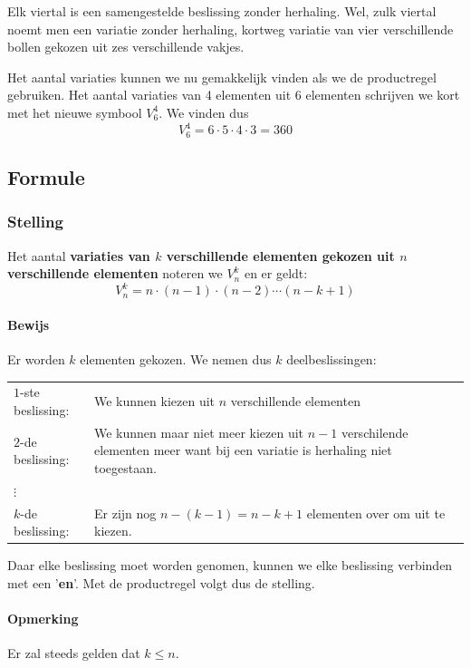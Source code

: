 \documentclass[12pt,a4paper,twoside]{article}
\begin{document}
Elk viertal is een samengestelde beslissing zonder herhaling. Wel, zulk viertal
noemt men een variatie zonder herhaling, kortweg variatie van vier verschillende bollen gekozen uit zes verschillende vakjes.

Het aantal variaties kunnen we nu gemakkelijk vinden als we de productregel gebruiken. Het aantal variaties van 4 elementen uit 6 elementen schrijven we kort met het nieuwe symbool $V^4_6$. We vinden dus
\[ V^4_6 = 6 \cdot 5 \cdot 4 \cdot 3 = 360 \]

\subsection{Formule}

\subsubsection*{Stelling}
\begin{mdframed}
Het aantal {\bf variaties van $k$ verschillende elementen gekozen uit $n$ verschillende elementen} noteren we $V^k_n$ en er geldt:
$$V^k_n=n \cdot (n-1) \cdot (n-2) \cdots (n-k+1)$$
\end{mdframed}

\paragraph*{Bewijs}
Er worden $k$ elementen gekozen. We nemen dus $k$ deelbeslissingen:
\begin{center}
\begin{tabular}{lp{12cm}}
$1$-ste beslissing: & We kunnen kiezen uit $n$ verschillende elementen\\
$2$-de beslissing: & We kunnen maar niet meer kiezen uit $n-1$ verschilende elementen meer want bij een variatie is herhaling niet toegestaan.\\
$\vdots$ & \\
$k$-de beslissing: & Er zijn nog $n-(k-1)=n-k+1$ elementen over om uit te kiezen.
\end{tabular}
\end{center}
Daar elke beslissing moet worden genomen, kunnen we elke beslissing verbinden met een '{\bf en}'. Met de productregel volgt dus de stelling.


\paragraph*{Opmerking} Er zal steeds gelden dat $k\leq n$.
\end{document}
